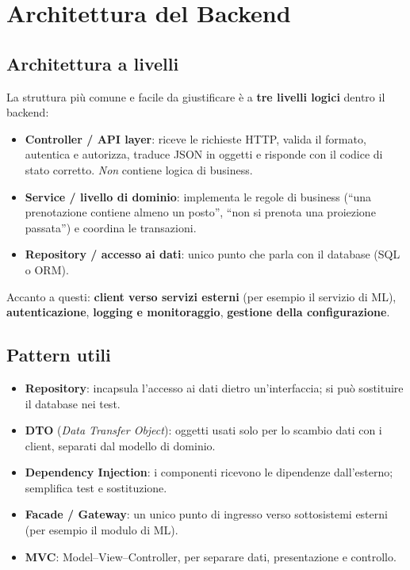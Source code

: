 \section{Architettura del Backend}

\subsection{Architettura a livelli}
La struttura più comune e facile da giustificare è a \textbf{tre livelli logici} dentro il backend:
\begin{itemize}
    \item \textbf{Controller / API layer}: riceve le richieste HTTP, valida il formato, autentica e autorizza, traduce JSON in oggetti e risponde con il codice di stato corretto. \emph{Non} contiene logica di business.
    \item \textbf{Service / livello di dominio}: implementa le regole di business (``una prenotazione contiene almeno un posto'', ``non si prenota una proiezione passata'') e coordina le transazioni.
    \item \textbf{Repository / accesso ai dati}: unico punto che parla con il database (SQL o ORM).
\end{itemize}
Accanto a questi: \textbf{client verso servizi esterni} (per esempio il servizio di ML), \textbf{autenticazione}, \textbf{logging e monitoraggio}, \textbf{gestione della configurazione}.

\subsection{Pattern utili}
\begin{itemize}
    \item \textbf{Repository}: incapsula l'accesso ai dati dietro un'interfaccia; si può sostituire il database nei test.
    \item \textbf{DTO} (\emph{Data Transfer Object}): oggetti usati solo per lo scambio dati con i client, separati dal modello di dominio.
    \item \textbf{Dependency Injection}: i componenti ricevono le dipendenze dall'esterno; semplifica test e sostituzione.
    \item \textbf{Facade / Gateway}: un unico punto di ingresso verso sottosistemi esterni (per esempio il modulo di ML).
    \item \textbf{MVC}: Model--View--Controller, per separare dati, presentazione e controllo.
\end{itemize}

